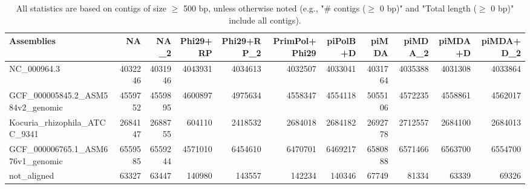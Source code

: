 \documentclass[12pt,a4paper]{article}
\begin{document}
\begin{table}[ht]
\begin{center}
\caption{All statistics are based on contigs of size $\geq$ 500 bp, unless otherwise noted (e.g., "\# contigs ($\geq$ 0 bp)" and "Total length ($\geq$ 0 bp)" include all contigs).}
\begin{tabular}{|l*{10}{|r}|}
\hline
Assemblies & NA & NA\_2 & Phi29+RP & Phi29+RP\_2 & PrimPol+Phi29 & piPolB+D & piMDA & piMDA\_2 & piMDA+D & piMDA+D\_2 \\ \hline
NC\_000964.3 & 4032246 & 4031946 & 4043931 & 4034613 & 4032507 & 4033041 & 4031764 & 4035388 & 4031308 & 4033864 \\ \hline
GCF\_000005845.2\_ASM584v2\_genomic & 4559752 & 4559895 & 4600897 & 4975634 & 4558347 & 4554118 & 5055106 & 4572235 & 4558861 & 4562017 \\ \hline
Kocuria\_rhizophila\_ATCC\_9341 & 2684147 & 2688755 & 604110 & 2418532 & 2684018 & 2684182 & 2692778 & 2712557 & 2684100 & 2684013 \\ \hline
GCF\_000006765.1\_ASM676v1\_genomic & 6559585 & 6559244 & 4571010 & 6454610 & 6470701 & 6469217 & 6580888 & 6571466 & 6563700 & 6554700 \\ \hline
not\_aligned & 63327 & 63447 & 140980 & 143557 & 142234 & 140346 & 67749 & 81334 & 63339 & 69326 \\ \hline
\end{tabular}
\end{center}
\end{table}
\end{document}
